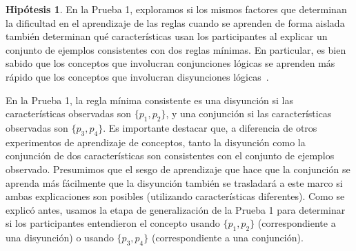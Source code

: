 \theoremstyle{definition}
\newtheorem{hyp}{Hipótesis}
\renewcommand\thehyp{\Roman{hyp}}
 

\begin{hyp}\label{Hip:AndOverOr} 
En la Prueba 1, exploramos si los mismos factores que determinan la dificultad en el aprendizaje de las reglas cuando se aprenden de forma aislada también determinan qué características usan los participantes al explicar un conjunto de ejemplos consistentes con dos reglas mínimas. En particular, es bien sabido que los conceptos que involucran conjunciones lógicas se aprenden más rápido que los conceptos que involucran disyunciones lógicas~\cite{bourne1970knowing}.

En la Prueba 1, la regla mínima consistente es una disyunción si las características observadas son $\{p_1, p_2 \}$, y una conjunción si las características observadas son $\{p_3, p_4 \}$. Es importante destacar que, a diferencia de otros experimentos de aprendizaje de conceptos, tanto la disyunción como la conjunción de dos características son consistentes con el conjunto de ejemplos observado. Presumimos que el sesgo de aprendizaje que hace que la conjunción se aprenda más fácilmente que la disyunción también se trasladará a este marco si ambas explicaciones son posibles (utilizando características diferentes). Como se explicó antes, usamos la etapa de generalización de la Prueba 1 para determinar si los participantes entendieron el concepto usando $\{p_1, p_2 \}$ (correspondiente a una disyunción) o usando $\{p_3, p_4 \} $ (correspondiente a una conjunción).


\end{hyp}
